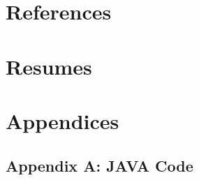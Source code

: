 \documentclass[11pt]{article}
\begin{document}
\section{References}

\printbibliography

\newpage
\section{Resumes}

%

\section{Appendices}
\subsection{Appendix A: JAVA Code}
\end{document}
